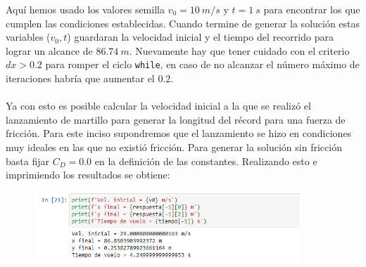 \documentclass[11pt]{article}
\begin{document}
	Aquí hemos usado los valores semilla $v_0=\SI{10}{m/s}$ y $t=\SI{1}{s}$ para encontrar los que cumplen las condiciones establecidas. Cuando termine de generar la solución estas variables ($v_0,t$) guardaran la velocidad inicial y el tiempo del recorrido para lograr un alcance de $\SI{86.74}{m}$. Nuevamente hay que tener cuidado con el criterio $dx > 0.2$ para romper el ciclo \texttt{while}, en caso de no alcanzar el número máximo de iteraciones habría que aumentar el 0.2.\\\\
	
	Ya con esto es posible calcular la velocidad inicial a la que se realizó el lanzamiento de martillo para generar la longitud del récord para una fuerza de fricción. Para este inciso supondremos que el lanzamiento se hizo en condiciones muy ideales en las que no existió fricción. Para generar la solución sin fricción basta fijar $C_D=0.0$ en la definición de las constantes. Realizando esto e imprimiendo los resultados se obtiene:
		\begin{figure}[h]
		\centering
		\includegraphics[width=10cm]{Img/7.PNG}
	\end{figure}
	
\end{document}
